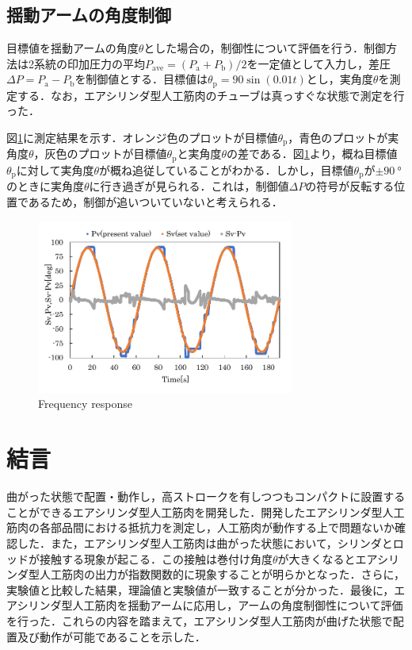 \subsection{揺動アームの角度制御}
目標値を揺動アームの角度$\theta$とした場合の，制御性について評価を行う．制御方法は2系統の印加圧力の平均$P_\mathrm{ave}=(P_\mathrm{a} + P_\mathrm{b})/2$を一定値として入力し，差圧$\Delta P = P_\mathrm{a} - P_\mathrm{b}$を制御値とする．目標値は$\theta_\mathrm{p} = 90 \sin(0.01t)$とし，実角度$\theta$を測定する．なお，エアシリンダ型人工筋肉のチューブは真っすぐな状態で測定を行った．
\par
図\ref{Frequency response}に測定結果を示す．オレンジ色のプロットが目標値$\theta_\mathrm{p}$，青色のプロットが実角度$\theta$，灰色のプロットが目標値$\theta_\mathrm{p}$と実角度$\theta$の差である．図\ref{Frequency response}より，概ね目標値$\theta_\mathrm{p}$に対して実角度$\theta$が概ね追従していることがわかる．しかし，目標値$\theta_\mathrm{p}$が$\pm \SI{90}{\degree}$のときに実角度$\theta$に行き過ぎが見られる．これは，制御値$\Delta P$の符号が反転する位置であるため，制御が追いついていないと考えられる．
\begin{figure}[t]
  \centering
  \includegraphics[width=85mm]{_pdf/result_frequency_response.pdf}
  \caption{Frequency response}
  \label{Frequency response}
\end{figure}

\section{結言}%
曲がった状態で配置・動作し，高ストロークを有しつつもコンパクトに設置することができるエアシリンダ型人工筋肉を開発した．開発したエアシリンダ型人工筋肉の各部品間における抵抗力を測定し，人工筋肉が動作する上で問題ないか確認した．また，エアシリンダ型人工筋肉は曲がった状態において，シリンダとロッドが接触する現象が起こる．この接触は巻付け角度$\theta$が大きくなるとエアシリンダ型人工筋肉の出力が指数関数的に現象することが明らかとなった．さらに，実験値と比較した結果，理論値と実験値が一致することが分かった．最後に，エアシリンダ型人工筋肉を揺動アームに応用し，アームの角度制御性について評価を行った．これらの内容を踏まえて，エアシリンダ型人工筋肉が曲げた状態で配置及び動作が可能であることを示した．